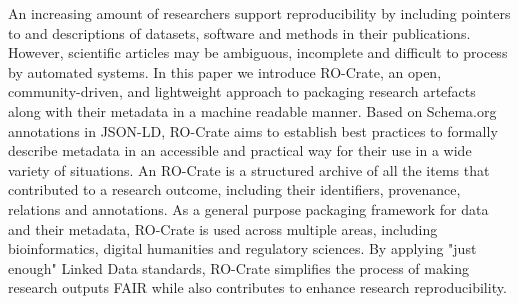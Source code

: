 An increasing amount of researchers support reproducibility by including pointers to and descriptions of datasets, software and methods in their publications. However, scientific articles may be ambiguous, incomplete and difficult to process by automated systems. In this paper we introduce RO-Crate, an open, community-driven, and lightweight approach to packaging research artefacts along with their metadata in a machine readable manner. Based on Schema.org annotations in JSON-LD, RO-Crate aims to establish best practices to formally describe metadata in an accessible and practical way for their use in a wide variety of situations. \markdownRendererInterblockSeparator
{}An RO-Crate is a structured archive of all the items that contributed to a research outcome, including their identifiers, provenance, relations and annotations. As a general purpose packaging framework for data and their metadata, RO-Crate is used across multiple areas, including bioinformatics, digital humanities and regulatory sciences. By applying "just enough" Linked Data standards, RO-Crate simplifies the process of making research outputs FAIR while also contributes to enhance research reproducibility.\relax